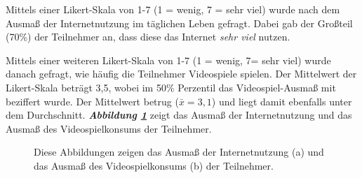 \documentclass[a4paper,11pt]{article}%
\renewcommand{\\}{\vspace*{0.5\baselineskip} \newline}
\begin{document}
{Mittels einer Likert-Skala von 1-7 (1 = wenig, 7 = sehr viel) wurde nach dem Ausmaß der Internetnutzung im täglichen Leben gefragt. Dabei gab der Großteil (70\%) der Teilnehmer an, dass diese das Internet \textit{sehr viel} nutzen.

Mittels einer weiteren Likert-Skala von 1-7 (1 = wenig, 7= sehr viel) wurde danach gefragt, wie häufig die Teilnehmer Videospiele spielen. Der Mittelwert der Likert-Skala beträgt 3,5, wobei im 50\% Perzentil das Videospiel-Ausmaß mit \grqq{} beziffert wurde. Der Mittelwert betrug ($\bar{x} = 3,1$) und liegt damit ebenfalls unter dem Durchschnitt.
\textbf{\textit{Abbildung \ref{teilnehmerInternetVideospiele}}} zeigt das Ausmaß der Internetnutzung und das Ausmaß des Videospielkonsums der Teilnehmer.
\begin{figure}[h]
  \centering
  \qquad
  \caption[Das Ausmaß der Internetnutzung und des Videospielkonsums der Teilnehmer]{Diese Abbildungen zeigen das Ausmaß der Internetnutzung (a) und das Ausmaß des Videospielkonsums (b) der Teilnehmer.}
  \label{teilnehmerInternetVideospiele}
\end{figure}

	
}
\end{document}
